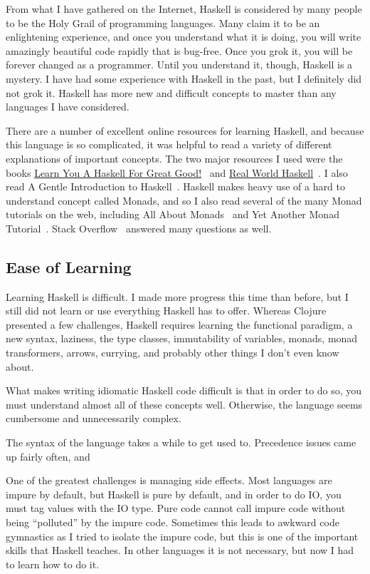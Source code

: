 \documentclass{article}
\begin{document}
From what I have gathered on the Internet, Haskell is considered by many people
to be the Holy Grail of programming languages.  Many claim it to be an
enlightening experience, and once you understand what it is doing, you will
write amazingly beautiful code rapidly that is bug-free.  Once you grok it, you
will be forever changed as a programmer.  Until you understand it, though,
Haskell is a mystery.  I have had some experience with Haskell in the past, but
I definitely did not grok it.  Haskell has more new and difficult concepts to
master than any languages I have considered.

There are a number of excellent online resources for learning Haskell, and
because this language is so complicated, it was helpful to read a variety of
different explanations of important concepts.  The two major resources I used
were the books \underline{Learn You A Haskell For Great
Good!}~\cite{learnyouahaskell} and \underline{Real World
Haskell}~\cite{realworldhaskell}.  I also read A Gentle Introduction to
Haskell~\cite{gentleintroduction}.  Haskell makes heavy use of a hard to
understand concept called Monads, and so I also read several of the many Monad
tutorials on the web, including All About Monads~\cite{allaboutmonads} and Yet
Another Monad Tutorial~\cite{yamt}.  Stack Overflow~\cite{stackoverflow}
answered many questions as well.

\subsection{Ease of Learning}

Learning Haskell is difficult.  I made more progress this time than before,
but I still did not learn or use everything Haskell has to offer.  Whereas
Clojure presented a few challenges, Haskell requires learning the functional
paradigm, a new syntax, laziness, the type classes, immutability of variables,
monads, monad transformers, arrows, currying, and probably other things I don't
even know about.

What makes writing idiomatic Haskell code difficult is that in order to do so,
you must understand almost all of these concepts well.  Otherwise, the
language seems cumbersome and unnecessarily complex.

The syntax of the language takes a while to get used to.  Precedence issues came
up fairly often, and 

One of the greatest challenges is managing side effects.  Most languages are
impure by default, but Haskell is pure by default, and in order to do IO, you
must tag values with the IO type.  Pure code cannot call impure code without
being ``polluted'' by the impure code.  Sometimes this leads to awkward code
gymnastics as I tried to isolate the impure code, but this is one of the
important skills that Haskell teaches.  In other languages it is not necessary,
but now I had to learn how to do it.
\end{document}
